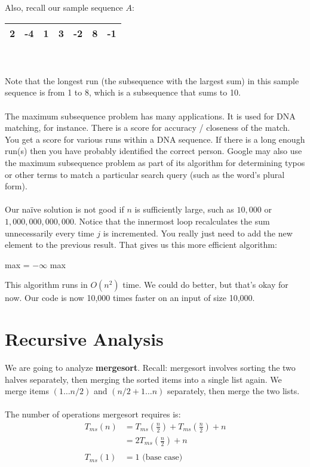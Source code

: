 \documentclass[]{article}
\theoremstyle{definition}
\begin{document}
			Also, recall our sample sequence $A$:
			\begin{tabular}{|c|c|c|c|c|c|c|}
				\hline 2 & -4 & 1 & 3 & -2 & 8 & -1 \\ \hline
			\end{tabular}
			\\ \\
			Note that the longest run (the subsequence with the largest sum) in this sample sequence is from 1 to 8, which is a subsequence that sums to 10.
			\\ \\
			The maximum subsequence problem has many applications. It is used for DNA matching, for instance. There is a score for accuracy / closeness of the match. You get a score for various runs within a DNA sequence. If there is a long enough run(s) then you have probably identified the correct person. Google may also use the maximum subsequence problem as part of its algorithm for determining typos or other terms to match a particular search query (such as the word's plural form).
			\\ \\
			Our na\"ive solution is not good if $n$ is sufficiently large, such as $10,000$ or $1,000,000,000,000$. Notice that the innermost loop recalculates the sum unnecessarily every time $j$ is incremented. You really just need to add the new element to the previous result. That gives us this more efficient algorithm: \\
			\begin{algorithm}[H]
				max = $-\infty$\;
				\Return max
			\end{algorithm}

			This algorithm runs in $O(n^2)$ time. We could do better, but that's okay for now. Our code is now 10,000 times faster on an input of size 10,000.
	\section{Recursive Analysis}
		We are going to analyze \textbf{mergesort}. Recall: mergesort involves sorting the two halves separately, then merging the sorted items into a single list again. We merge items $(1 \ldots n/2)$ and $(n/2 + 1 \ldots n)$ separately, then merge the two lists.
		\\ \\
		The number of operations mergesort requires is:
		\begin{align*}
			T_{ms}(n) &= T_{ms}\left( \frac{n}{2} \right) + T_{ms}\left( \frac{n}{2} \right) + n \\
			&= 2T_{ms}\left( \frac{n}{2} \right) + n
			\\ \\
			T_{ms}(1) &= 1 \text{ (base case)}
		\end{align*}
\end{document}
